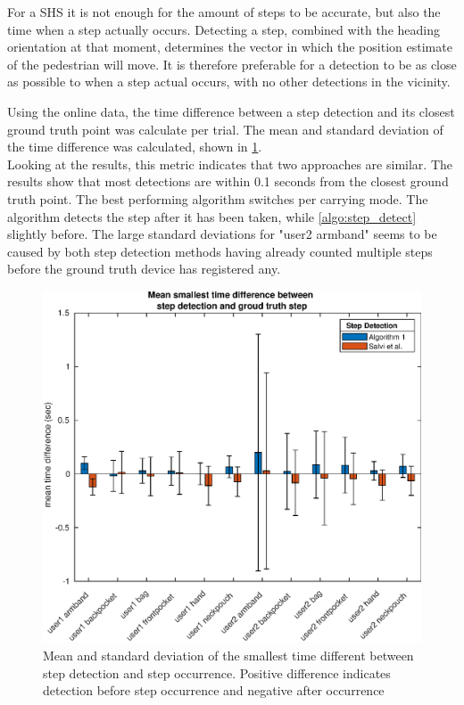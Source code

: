 For a \ac{SHS} it is not enough for the amount of steps to be accurate, but also the time when a step actually occurs. Detecting a step, combined with the heading orientation at that moment, determines the vector in which the position estimate of the pedestrian will move. It is therefore preferable for a detection to be as close as possible to when a step actual occurs, with no other detections in the vicinity. \par
Using the online data, the time difference between a step detection and its closest ground truth point was calculate per trial. The mean and standard deviation of the time difference was calculated, shown in \cref{fig:202011130914smallest_diff_to_gt_1}.\\ Looking at the results, this metric indicates that two approaches are similar. The results show that most detections are within 0.1 seconds from the closest ground truth point. The best performing algorithm switches per carrying mode. The \citet{Salvi2018} algorithm detects the step after it has been taken, while \cref{algo:step_detect} slightly before. The large standard deviations for "user2 armband" seems to be caused by both step detection methods having already counted multiple steps before the ground truth device has registered any.

\begin{figure}[H]
	\centering
	\includegraphics[width=0.7\linewidth]{images/20201113_0914_smallest_diff_to_gt_1}
	\caption{Mean and standard deviation of the smallest time different between step detection and step occurrence. Positive difference indicates detection before step occurrence and negative after occurrence}
	\label{fig:202011130914smallest_diff_to_gt_1}
\end{figure}

